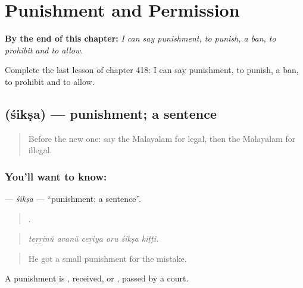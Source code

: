 
\chapter{Punishment and Permission}
\label{ch:ml-punishment-and-permission}

\begin{chapteropening}
\textbf{By the end of this chapter:} \emph{I can say punishment, to punish, a ban, to prohibit and to allow.}

Complete the last lesson of chapter 418: I can say punishment, to punish, a ban, to prohibit and to allow.
\end{chapteropening}

\section[\texorpdfstring{\ml{ശിക്ഷ} (śikṣa)}{ശിക്ഷ (śikṣa)}]{ (śikṣa) — punishment; a sentence}

\label{lesson:ML-C418-siksa}



\begin{quote}
Before the new one: say the Malayalam for legal, then the Malayalam for illegal.
\end{quote}

\subsection*{You'll want to know: }
\textbf{} — \emph{śikṣa} — \textquotedblleft{}punishment; a sentence\textquotedblright{}.

\begin{quote}
     .
\end{quote}

\begin{quote}
\emph{teṟṟinŭ avanŭ ceṟiya oru śikṣa kiṭṭi.}
\end{quote}

\begin{quote}
He got a small punishment for the mistake.
\end{quote}

A punishment is , received, or , passed by a court.

